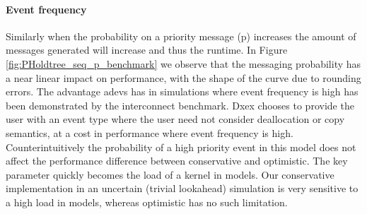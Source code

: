 \paragraph*{Event frequency}
Similarly when the probability on a priority message (p) increases the amount of messages generated will increase and thus the runtime. In Figure \ref{fig:PHoldtree_seq_p_benchmark} we observe that the messaging probability has a near linear impact on performance, with the shape of the curve due to rounding errors. The advantage adevs has in simulations where event frequency is high has been demonstrated by the interconnect benchmark. Dxex chooses to provide the user with an event type where the user need not consider deallocation or copy semantics, at a cost in performance where event frequency is high. Counterintuitively the probability of a high priority event in this model does not affect the performance difference between conservative and optimistic. The key parameter quickly becomes the load of a kernel in models. Our conservative implementation in an uncertain (trivial lookahead) simulation is very sensitive to a high load in models, whereas optimistic has no such limitation.
